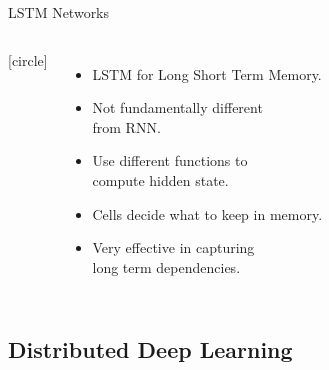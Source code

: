 \begin{frame}{LSTM Networks}
    \begin{columns}
        [circle]
        \begin{itemize}
            \item{LSTM for Long Short Term Memory.}
            \vspace{0.2cm}
            \item{Not fundamentally different\\from RNN.}
            \vspace{0.2cm}
            \item{Use different functions to\\compute hidden state.}
            \vspace{0.2cm}
            \item{Cells decide what to keep in memory.}
            \vspace{0.2cm}
            \item{Very effective in capturing\\long term dependencies.}
        \end{itemize}
        \begin{figure}
            \label{fig:rnn-vs-lstm}
        \end{figure}
    \end{columns}
\end{frame}

\subsection{Distributed Deep Learning}\label{subsec:distributed-deep-learning}

